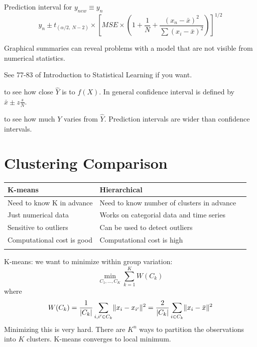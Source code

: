 \begin{description}
\begin{enumerate}
Prediction interval for $y_{new} \equiv y_n$
\begin{equation}\label{eq:predInterval}
\hat y_n \pm t_{(\alpha/2,~N-2)} \times \left [MSE \times \left (1 + \frac{1}{N} + \frac{(x_n - \bar x)^2}{\sum(x_i - \bar x)^2}    \right)   \right ]^{1/2}
\end{equation}

Graphical summaries can reveal problems with a 
model that are not visible from numerical statistics.

See 77-83 of Introduction to Statistical 
Learning\cite{james2013introduction} if you want.
\end{enumerate}

\item [Confidence Intervals] to see how close $\hat Y$ is
to $f(X)$. In general confidence interval is defined by
$\bar x \pm z\frac{s}{N}$.

\item [Prediction Intervals] to see how much $Y$ varies from $\hat Y$.
Prediction intervals are wider than confidence intervals.
\end{description}



\section{Clustering Comparison}
\label{sec:Clustering_Comparison_Interview}
\begin{tabular}{llr}
\firsthline
K-means    & Hierarchical \\
\hline
Need to know K in advance  & Need to know number of clusters in advance  \\
Just numerical data               & Works on categorial data and time series        \\
Sensitive to outliers               & Can be used to detect outliers  \\
Computational cost is good   & Computational cost is high         \\
\lasthline
\end{tabular}

K-means: we want to minimize within group variation:
\begin{equation}
\min_{C_1, \dots, C_K} \sum_{k=1}^K W(C_k)
\end{equation}
where
\begin{equation}
W(C_k) = \frac{1}{\lvert{C_k}\rvert}\sum_{i, i' \in C_k} \lVert{x_i - x_{i'}}\rVert^2 = 
\frac{2}{\lvert{C_k}\rvert}\sum_{i \in C_k} \lVert{x_i - \bar x}\rVert^2
\end{equation}
Minimizing this is very hard. There are $K^n$ ways to partition the observations 
into $K$ clusters. K-means converges to local minimum.

